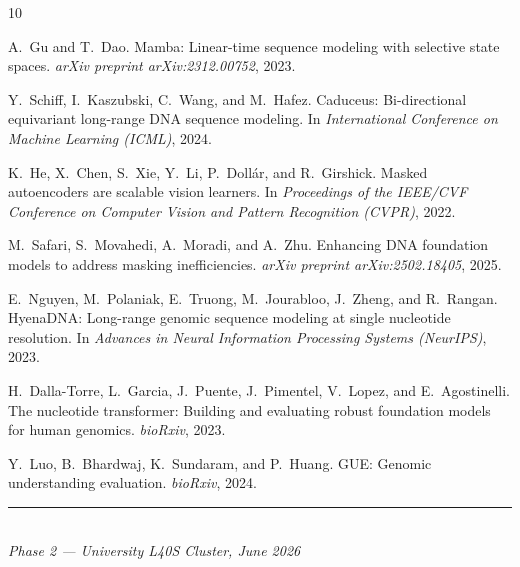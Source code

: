 \documentclass[11pt,a4paper,twoside]{article}
\begin{document}
\medskip
\begin{thebibliography}{10}
\small

A.~Gu and T.~Dao.
\newblock Mamba: Linear-time sequence modeling with selective state spaces.
\newblock \textit{arXiv preprint arXiv:2312.00752}, 2023.

Y.~Schiff, I.~Kaszubski, C.~Wang, and M.~Hafez.
\newblock Caduceus: Bi-directional equivariant long-range DNA sequence
modeling.
\newblock In \textit{International Conference on Machine Learning (ICML)},
2024.

K.~He, X.~Chen, S.~Xie, Y.~Li, P.~Doll{\'a}r, and R.~Girshick.
\newblock Masked autoencoders are scalable vision learners.
\newblock In \textit{Proceedings of the IEEE/CVF Conference on Computer
Vision and Pattern Recognition (CVPR)}, 2022.

M.~Safari, S.~Movahedi, A.~Moradi, and A.~Zhu.
\newblock Enhancing DNA foundation models to address masking inefficiencies.
\newblock \textit{arXiv preprint arXiv:2502.18405}, 2025.

E.~Nguyen, M.~Polaniak, E.~Truong, M.~Jourabloo, J.~Zheng, and
R.~Rangan.
\newblock HyenaDNA: Long-range genomic sequence modeling at single
nucleotide resolution.
\newblock In \textit{Advances in Neural Information Processing Systems
(NeurIPS)}, 2023.

H.~Dalla-Torre, L.~Garcia, J.~Puente, J.~Pimentel, V.~Lopez, and
E.~Agostinelli.
\newblock The nucleotide transformer: Building and evaluating robust
foundation models for human genomics.
\newblock \textit{bioRxiv}, 2023.

Y.~Luo, B.~Bhardwaj, K.~Sundaram, and P.~Huang.
\newblock GUE: Genomic understanding evaluation.
\newblock \textit{bioRxiv}, 2024.

\end{thebibliography}

\vfill
\begin{center}
\rule{0.4\textwidth}{0.5pt}\\[0.2cm]
{\small\em Phase 2 --- University L40S Cluster, June 2026}
\end{center}
\end{document}
